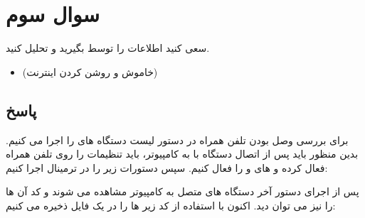 \documentclass{report}
\begin{document}
\section*{سوال سوم}
سعی کنید اطلاعات
 را توسط
 بگیرید و تحلیل کنید.
\begin{itemize}
	\item 
	 (خاموش و روشن کردن اینترنت)
\end{itemize}
\subsection*{پاسخ}
برای بررسی وصل بودن تلفن همراه در 
دستور لیست دستگاه های
را اجرا می کنیم. بدین منظور باید پس از اتصال دستگاه با 
به کامپیوتر، باید تنظیمات 
را روی تلفن همراه فعال کرده و 
های 
و 
را فعال کنیم. سپس دستورات زیر را در ترمینال اجرا کنیم:
\begin{latin}
	
	\label{code:DeverloperCommands}
\end{latin}
پس از اجرای دستور آخر دستگاه های متصل به کامپیوتر مشاهده می شوند و کد آن ها را نیز می توان دید.
اکنون با استفاده از کد زیر 
ها را در یک فایل 
ذخیره می کنیم:
\begin{latin}
	
	\label{code:LogPrinter}
\end{latin}
\end{document}
